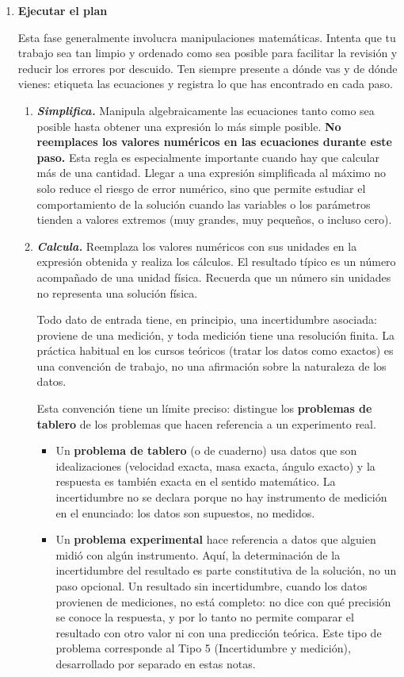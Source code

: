 \documentclass[11pt]{book}
\begin{document}
\begin{enumerate}
\item[C.] \textbf{Ejecutar el plan}

Esta fase generalmente involucra manipulaciones matemáticas. Intenta que tu trabajo sea tan limpio y ordenado como sea posible para facilitar la revisión y reducir los errores por descuido. Ten siempre presente a dónde vas y de dónde vienes: etiqueta las ecuaciones y registra lo que has encontrado en cada paso.

\begin{enumerate}
    \item[II.] {\it\bf Simplifica.} Manipula algebraicamente las ecuaciones tanto como sea posible hasta obtener una expresión lo más simple posible. {\bf No reemplaces los valores numéricos en las ecuaciones durante este paso.} Esta regla es especialmente importante cuando hay que calcular más de una cantidad. Llegar a una expresión simplificada al máximo no solo reduce el riesgo de error numérico, sino que permite estudiar el comportamiento de la solución cuando las variables o los parámetros tienden a valores extremos (muy grandes, muy pequeños, o incluso cero).

    \item[III.] {\it\bf Calcula.} Reemplaza los valores numéricos con sus unidades en la expresión obtenida y realiza los cálculos. El resultado típico es un número acompañado de una unidad física. Recuerda que un número sin unidades no representa una solución física.

    Todo dato de entrada tiene, en principio, una incertidumbre asociada: proviene de una medición, y toda medición tiene una resolución finita. La práctica habitual en los cursos teóricos (tratar los datos como exactos) es una convención de trabajo, no una afirmación sobre la naturaleza de los datos.

    Esta convención tiene un límite preciso: distingue los {\bf problemas de tablero} de los problemas que hacen referencia a un experimento real.
    \begin{itemize}
        \item Un {\bf problema de tablero} (o de cuaderno) usa datos que son idealizaciones (velocidad exacta, masa exacta, ángulo exacto) y la respuesta es también exacta en el sentido matemático. La incertidumbre no se declara porque no hay instrumento de medición en el enunciado: los datos son supuestos, no medidos.
        \item Un {\bf problema experimental} hace referencia a datos que alguien midió con algún instrumento. Aquí, la determinación de la incertidumbre del resultado es parte constitutiva de la solución, no un paso opcional. Un resultado sin incertidumbre, cuando los datos provienen de mediciones, no está completo: no dice con qué precisión se conoce la respuesta, y por lo tanto no permite comparar el resultado con otro valor ni con una predicción teórica. Este tipo de problema corresponde al Tipo 5 (Incertidumbre y medición), desarrollado por separado en estas notas.
    \end{itemize}


\end{enumerate}
\end{enumerate}
\end{document}
